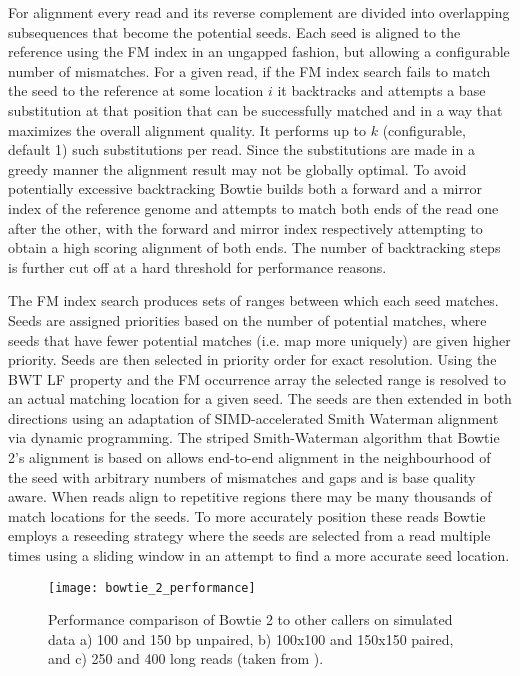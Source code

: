 For alignment every read and its reverse complement are divided into overlapping subsequences that become the potential seeds. Each seed is aligned to the reference using the FM index in an ungapped fashion, but allowing a configurable number of mismatches. For a given read, if the FM index search fails to match the seed to the reference at some location $i$ it backtracks and attempts a base substitution at that position that can be successfully matched and in a way that maximizes the overall alignment quality. It performs up to $k$ (configurable, default 1) such substitutions per read. Since the substitutions are made in a greedy manner the alignment result may not be globally optimal. To avoid potentially excessive backtracking Bowtie builds both a forward and a mirror index of the reference genome and attempts to match both ends of the read one after the other, with the forward and mirror index respectively attempting to obtain a high scoring alignment of both ends. The number of backtracking steps is further cut off at a hard threshold for performance reasons.

The FM index search produces sets of ranges between which each seed matches. Seeds are assigned priorities based on the number of potential matches, where seeds that have fewer potential matches (i.e. map more uniquely) are given higher priority. Seeds are then selected in priority order for exact resolution. Using the BWT LF property and the FM occurrence array the selected range is resolved to an actual matching location for a given seed. The seeds are then extended in both directions using an adaptation of SIMD-accelerated Smith Waterman alignment via dynamic programming. The striped Smith-Waterman algorithm\autocite{farrar2006striped} that Bowtie 2's alignment is based on allows end-to-end alignment in the neighbourhood of the seed with arbitrary numbers of mismatches and gaps and is base quality aware. When reads align to repetitive regions there may be many thousands of match locations for the seeds. To more accurately position these reads Bowtie employs a reseeding strategy where the seeds are selected from a read multiple times using a sliding window in an attempt to find a more accurate seed location. 

\begin{figure}[h!]
    \texttt{[image: bowtie\_2\_performance]}
    \centering
    \caption {Performance comparison of Bowtie 2 to other callers on simulated data a) 100 and 150 bp unpaired, b) 100x100 and 150x150 paired, and c) 250 and 400 long reads (taken from \autocite{langmead2012fast}).}
    \label{fig:bowtie_2_performance}
\end{figure}

